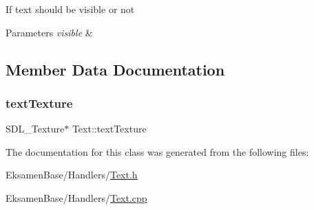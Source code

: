If text should be visible or not 


\begin{DoxyParams}{Parameters}
{\em visible} & \\
\hline
\end{DoxyParams}


\subsection{Member Data Documentation}
\mbox{\label{class_text_a0db81807f575e9f4ff86bdae450ee246}} 
\subsubsection{\texorpdfstring{text\+Texture}{textTexture}}
{\footnotesize\ttfamily S\+D\+L\+\_\+\+Texture$\ast$ Text\+::text\+Texture}



The documentation for this class was generated from the following files\+:\begin{DoxyCompactItemize}
\item 
Eksamen\+Base/\+Handlers/\mbox{\hyperlink{_text_8h}{Text.\+h}}\item 
Eksamen\+Base/\+Handlers/\mbox{\hyperlink{_text_8cpp}{Text.\+cpp}}\end{DoxyCompactItemize}
